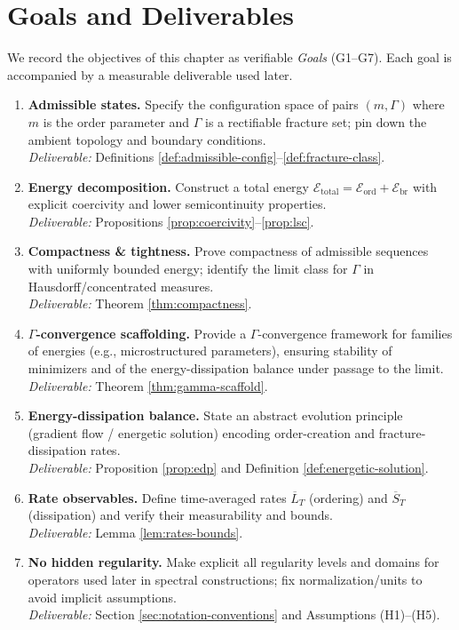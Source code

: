 \section{Goals and Deliverables}\label{sec:var-goals}
We record the objectives of this chapter as verifiable \emph{Goals} (G1--G7). Each goal is accompanied by a measurable deliverable used later.

\begin{enumerate}[label=\textbf{G\arabic*}.]
  \item \textbf{Admissible states.} Specify the configuration space of pairs $(m,\Gamma)$ where $m$ is the order parameter and $\Gamma$ is a rectifiable fracture set; pin down the ambient topology and boundary conditions.\\
  \emph{Deliverable:} Definitions \ref{def:admissible-config}--\ref{def:fracture-class}.
  \item \textbf{Energy decomposition.} Construct a total energy $\mathcal{E}_{\mathrm{total}}=\mathcal{E}_{\mathrm{ord}}+\mathcal{E}_{\mathrm{br}}$ with explicit coercivity and lower semicontinuity properties.\\
  \emph{Deliverable:} Propositions \ref{prop:coercivity}--\ref{prop:lsc}.
  \item \textbf{Compactness \& tightness.} Prove compactness of admissible sequences with uniformly bounded energy; identify the limit class for $\Gamma$ in Hausdorff/concentrated measures.\\
  \emph{Deliverable:} Theorem \ref{thm:compactness}.
  \item \textbf{$\Gamma$-convergence scaffolding.} Provide a $\Gamma$-convergence framework for families of energies (e.g., microstructured parameters), ensuring stability of minimizers and of the energy-dissipation balance under passage to the limit.\\
  \emph{Deliverable:} Theorem \ref{thm:gamma-scaffold}.
  \item \textbf{Energy-dissipation balance.} State an abstract evolution principle (gradient flow / energetic solution) encoding order-creation and fracture-dissipation rates.\\
  \emph{Deliverable:} Proposition \ref{prop:edp} and Definition \ref{def:energetic-solution}.
  \item \textbf{Rate observables.} Define time-averaged rates $\overline{L}_T$ (ordering) and $\overline{S}_T$ (dissipation) and verify their measurability and bounds.\\
  \emph{Deliverable:} Lemma \ref{lem:rates-bounds}.
  \item \textbf{No hidden regularity.} Make explicit all regularity levels and domains for operators used later in spectral constructions; fix normalization/units to avoid implicit assumptions.\\
  \emph{Deliverable:} Section \ref{sec:notation-conventions} and Assumptions (H1)--(H5).
\end{enumerate}

